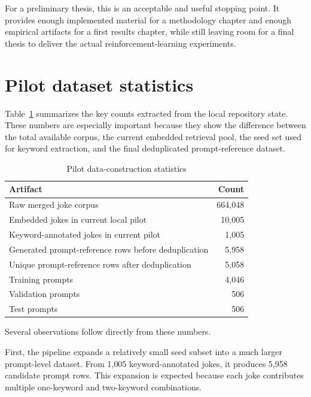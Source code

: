 \documentclass[14pt,a4paper]{extreport}
\begin{document}
For a preliminary thesis, this is an acceptable and useful stopping point. It provides enough implemented material for a methodology chapter and enough empirical artifacts for a first results chapter, while still leaving room for a final thesis to deliver the actual reinforcement-learning experiments.

\section{Pilot dataset statistics}

Table~\ref{tab:pilotstats} summarizes the key counts extracted from the local repository state. These numbers are especially important because they show the difference between the total available corpus, the current embedded retrieval pool, the seed set used for keyword extraction, and the final deduplicated prompt-reference dataset.

\begin{table}[ht]
  \centering
  \caption{Pilot data-construction statistics}
  \label{tab:pilotstats}
  \begin{tabular}{p{}r}
    \toprule
    Artifact                                             & Count     \\
    \midrule
    Raw merged joke corpus                               & 664{,}048 \\
    Embedded jokes in current local pilot                & 10{,}005  \\
    Keyword-annotated jokes in current pilot             & 1{,}005   \\
    Generated prompt-reference rows before deduplication & 5{,}958   \\
    Unique prompt-reference rows after deduplication     & 5{,}058   \\
    Training prompts                                     & 4{,}046   \\
    Validation prompts                                   & 506       \\
    Test prompts                                         & 506       \\
    \bottomrule
  \end{tabular}
\end{table}

Several observations follow directly from these numbers.

First, the pipeline expands a relatively small seed subset into a much larger prompt-level dataset. From 1{,}005 keyword-annotated jokes, it produces 5{,}958 candidate prompt rows. This expansion is expected because each joke contributes multiple one-keyword and two-keyword combinations.
\end{document}
